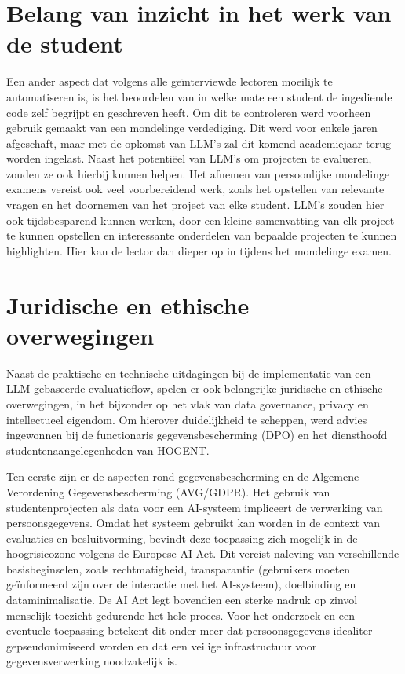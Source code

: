 \section{Belang van inzicht in het werk van de student}

Een ander aspect dat volgens alle geïnterviewde lectoren moeilijk te automatiseren is, is het beoordelen van in welke mate een student de ingediende code zelf begrijpt en geschreven heeft. Om dit te controleren werd voorheen gebruik gemaakt van een mondelinge verdediging. Dit werd voor enkele jaren afgeschaft, maar met de opkomst van LLM's zal dit komend academiejaar terug worden ingelast. Naast het potentiëel van LLM's om projecten te evalueren, zouden ze ook hierbij kunnen helpen. Het afnemen van persoonlijke mondelinge examens vereist ook veel voorbereidend werk, zoals het opstellen van relevante vragen en het doornemen van het project van elke student. LLM's zouden hier ook tijdsbesparend kunnen werken, door een kleine samenvatting van elk project te kunnen opstellen en interessante onderdelen van bepaalde projecten te kunnen highlighten. Hier kan de lector dan dieper op in tijdens het mondelinge examen.

\section{Juridische en ethische overwegingen}

Naast de praktische en technische uitdagingen bij de implementatie van een LLM-gebaseerde evaluatieflow, spelen er ook belangrijke juridische en ethische overwegingen, in het bijzonder op het vlak van data governance, privacy en intellectueel eigendom. Om hierover duidelijkheid te scheppen, werd advies ingewonnen bij de functionaris gegevensbescherming (DPO) en het diensthoofd studentenaangelegenheden van HOGENT.

\vspace{1em}

Ten eerste zijn er de aspecten rond gegevensbescherming en de Algemene Verordening Gegevensbescherming (AVG/GDPR). Het gebruik van studentenprojecten als data voor een AI-systeem impliceert de verwerking van persoonsgegevens. Omdat het systeem gebruikt kan worden in de context van evaluaties en besluitvorming, bevindt deze toepassing zich mogelijk in de hoogrisicozone volgens de Europese AI Act. Dit vereist naleving van verschillende basisbeginselen, zoals rechtmatigheid, transparantie (gebruikers moeten geïnformeerd zijn over de interactie met het AI-systeem), doelbinding en dataminimalisatie. De AI Act legt bovendien een sterke nadruk op zinvol menselijk toezicht gedurende het hele proces. Voor het onderzoek en een eventuele toepassing betekent dit onder meer dat persoonsgegevens idealiter gepseudonimiseerd worden en dat een veilige infrastructuur voor gegevensverwerking noodzakelijk is.


